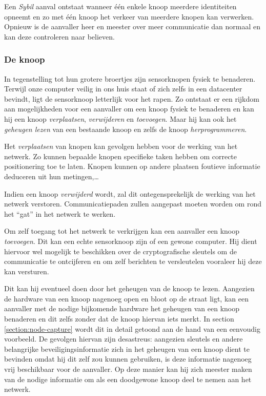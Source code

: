 Een \emph{Sybil} aanval ontstaat wanneer \'e\'en enkele knoop meerdere
identiteiten opneemt en zo met \'e\'en knoop het verkeer van meerdere knopen
kan verwerken. Opnieuw is de aanvaller heer en meester over meer communicatie
dan normaal en kan deze controleren naar believen.

\subsubsection*{De knoop}

In tegenstelling tot hun grotere broertjes zijn sensorknopen fysiek te
benaderen. Terwijl onze computer veilig in ons huis staat of zich zelfs in een
datacenter bevindt, ligt de sensorknoop letterlijk voor het rapen. Zo ontstaat
er een rijkdom aan mogelijkheden voor een aanvaller om een knoop fysiek te
benaderen en kan hij een knoop \emph{verplaatsen}, \emph{verwijderen} en
\emph{toevoegen}. Maar hij kan ook het \emph{geheugen lezen} van een bestaande
knoop en zelfs de knoop \emph{herprogrammeren}.

Het \emph{verplaatsen} van knopen kan gevolgen hebben voor de werking van het
netwerk. Zo kunnen bepaalde knopen specifieke taken hebben om correcte
positionering toe te laten. Knopen kunnen op andere plaatsen foutieve
informatie deduceren uit hun metingen,\dots

Indien een knoop \emph{verwijderd} wordt, zal dit ontegensprekelijk de werking
van het netwerk verstoren. Communicatiepaden zullen aangepast moeten worden om
rond het ``gat'' in het netwerk te werken.

Om zelf toegang tot het netwerk te verkrijgen kan een aanvaller een knoop
\emph{toevoegen}. Dit kan een echte sensorknoop zijn of een gewone computer.
Hij dient hiervoor wel mogelijk te beschikken over de cryptografische sleutels
om de communicatie te ontcijferen en om zelf berichten te versleutelen
vooraleer hij deze kan versturen.

Dit kan hij eventueel doen door het geheugen van de knoop te lezen. Aangezien
de hardware van een knoop nagenoeg open en bloot op de straat ligt, kan een
aanvaller met de nodige bijkomende hardware het geheugen van een knoop
benaderen en dit zelfs zonder dat de knoop hiervan iets merkt. In section
\ref{section:node-capture} wordt dit in detail getoond aan de hand van een
eenvoudig voorbeeld. De gevolgen hiervan zijn desastreus: aangezien sleutels en
andere belangrijke beveiligingsinformatie zich in het geheugen van een knoop
dient te bevinden omdat hij dit zelf zou kunnen gebruiken, is deze informatie
nagenoeg vrij beschikbaar voor de aanvaller. Op deze manier kan hij zich
meester maken van de nodige informatie om als een doodgewone knoop deel te
nemen aan het netwerk.

